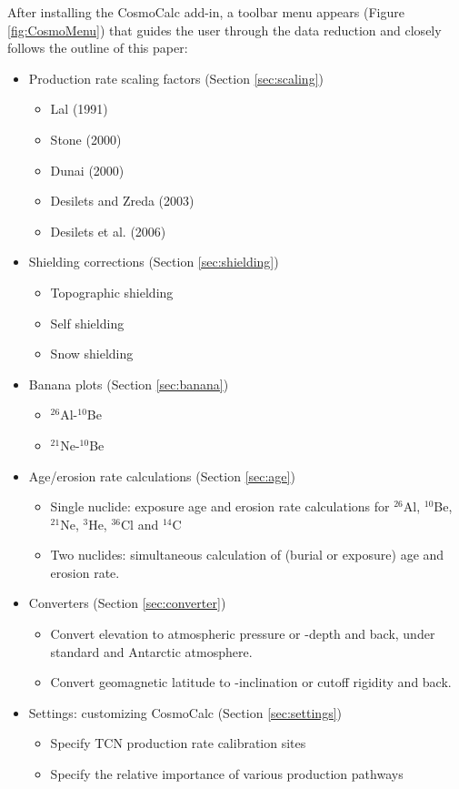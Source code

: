 \documentclass{article}
\begin{document}
After installing the CosmoCalc  add-in, a toolbar menu appears (Figure
\ref{fig:CosmoMenu}) that  guides the user through  the data reduction
and closely follows the outline of this paper:

\begin{itemize}
\item{Production rate scaling factors} (Section \ref{sec:scaling})
  \begin{itemize}
  \item Lal (1991)
  \item Stone (2000)
  \item Dunai (2000)
  \item Desilets and Zreda (2003)
  \item Desilets et al. (2006)
  \end{itemize}
\item{Shielding corrections} (Section \ref{sec:shielding})
  \begin{itemize}
  \item Topographic shielding
  \item Self shielding
  \item Snow shielding
  \end{itemize}
\item{Banana plots} (Section \ref{sec:banana})
  \begin{itemize}
  \item $^{26}$Al-$^{10}$Be
  \item $^{21}$Ne-$^{10}$Be 
  \end{itemize}
\item{Age/erosion rate calculations} (Section \ref{sec:age})
  \begin{itemize}
  \item Single nuclide: exposure age and erosion rate calculations for 
    $^{26}$Al, $^{10}$Be, $^{21}$Ne, $^{3}$He, $^{36}$Cl and $^{14}$C
  \item Two nuclides: simultaneous calculation of (burial or exposure)
    age and erosion rate.
  \end{itemize}
\item{Converters} (Section \ref{sec:converter})
  \begin{itemize}
  \item Convert elevation to  atmospheric pressure or -depth and back,
    under standard and Antarctic atmosphere.
  \item  Convert  geomagnetic   latitude  to  -inclination  or  cutoff
    rigidity and back.
  \end{itemize}
\item{Settings: customizing CosmoCalc} (Section \ref{sec:settings})
  \begin{itemize}
  \item Specify  TCN production rate calibration sites
  \item Specify the relative importance of various production pathways
  \end{itemize}
\end{itemize}
\end{document}
